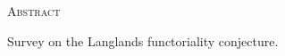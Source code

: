 \begin{center}
  \textsc{Abstract}
\end{center}
%
\noindent
%
Survey on the Langlands functoriality conjecture.